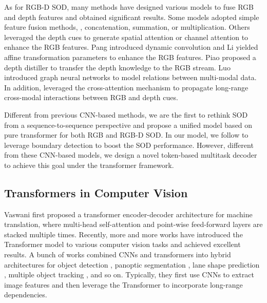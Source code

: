 \documentclass[10pt,twocolumn,letterpaper]{article}
\begin{document}
As for RGB-D SOD, 
many methods have designed various models to fuse RGB and depth features and obtained significant results.
Some models \cite{chen2018progressively, chen2019three, Fu2020JLDCF} adopted simple feature fusion methods, \ie, concatenation, summation, or multiplication.
Others \cite{zhao2019contrast, li2020icnet, Piao2019dmra, Li2020CMWNet} leveraged the depth cues to generate spatial attention or channel attention to enhance the RGB features.
Pang \etal \cite{HDFNet-ECCV2020} introduced dynamic convolution and Li \etal \cite{li2020cmMS} yielded affine transformation parameters to enhance the RGB features.
Piao \etal \cite{piao2020a2dele} proposed a depth distiller to transfer the depth knowledge to the RGB stream. Luo \etal \cite{luo2020Cas-Gnn} introduced graph neural networks to model relations between multi-modal data.
In addition, \cite{liu2020S2MA, liu2020ReDWeb-S, chen2020dpanet} leveraged the cross-attention mechanism to propagate long-range cross-modal interactions between RGB and depth cues.

Different from previous CNN-based methods, we are the first to rethink SOD from a sequence-to-sequence perspective and propose a unified model based on pure transformer 
for both RGB and RGB-D SOD. In our model, we follow \cite{qin2019basnet, zhao2019EGNet,CVPR2020_LDF,zhang2020select,Wei2020CoNet} to leverage boundary detection to boost the SOD performance. However, different from these CNN-based models, we design a novel token-based multitask decoder to achieve this goal under the transformer framework.


\subsection{Transformers in Computer Vision}
Vaswani \etal \cite{vaswani2017attention} first proposed a transformer encoder-decoder architecture for machine translation, where multi-head self-attention and point-wise feed-forward layers are stacked multiple times.
Recently, more and more works have introduced the Transformer model to various computer vision tasks and achieved excellent results. 
A bunch of works combined CNNs and transformers into hybrid architectures for object detection \cite{carion2020end,zhu2020deformable}, panoptic segmentation \cite{wang2020maxdeeplab}, lane shape prediction \cite{liu2021end}, multiple object tracking \cite{sun2020transtrack}, and so on. Typically, they first use CNNs to extract image features and then leverage the Transformer to incorporate long-range dependencies.
\end{document}
